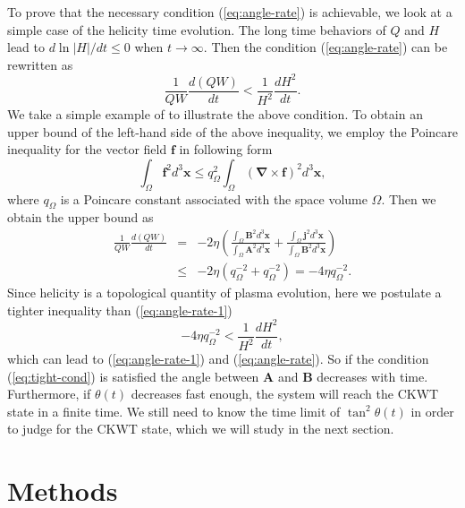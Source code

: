 \documentclass[english,aps,superscriptaddress,preprint]{revtex4-1}
\begin{document}
To prove that the necessary condition (\ref{eq:angle-rate}) is achievable,
we look at a simple case of the helicity time evolution. The long
time behaviors of $Q$ and $H$ lead to $d\ln|H|/dt\leq0$ when $t\rightarrow\infty$.
Then the condition (\ref{eq:angle-rate}) can be rewritten as 
\begin{equation}
\frac{1}{QW}\frac{d(QW)}{dt}<\frac{1}{H^{2}}\frac{dH^{2}}{dt}.\label{eq:angle-rate-1}
\end{equation}
We take a simple example of to illustrate the above condition. To
obtain an upper bound of the left-hand side of the above inequality,
we employ the Poincare inequality for the vector field $\boldsymbol{f}$
in following form \citep{Poincare1890}
\begin{equation}
\int_{\Omega}\boldsymbol{f}^{2}d^{3}\boldsymbol{x}\leq q_{\Omega}^{2}\int_{\Omega}(\boldsymbol{\nabla\times f})^{2}d^{3}\boldsymbol{x},
\end{equation}
where $q_{\Omega}$ is a Poincare constant associated with the space
volume $\Omega$. Then we obtain the upper bound as 
\begin{eqnarray}
\frac{1}{QW}\frac{d(QW)}{dt} & = & -2\eta\left(\frac{\int_{\Omega}\boldsymbol{B}^{2}d^{3}\boldsymbol{x}}{\int_{\Omega}\boldsymbol{A}^{2}d^{3}\boldsymbol{x}}+\frac{\int_{\Omega}\boldsymbol{j}^{2}d^{3}\boldsymbol{x}}{\int_{\Omega}\boldsymbol{B}^{2}d^{3}\boldsymbol{x}}\right)\nonumber \\
 & \leq & -2\eta(q_{\Omega}^{-2}+q_{\Omega}^{-2})=-4\eta q_{\Omega}^{-2}.
\end{eqnarray}
Since helicity is a topological quantity of plasma evolution, here
we postulate a tighter inequality than (\ref{eq:angle-rate-1})
\begin{equation}
-4\eta q_{\Omega}^{-2}<\frac{1}{H^{2}}\frac{dH^{2}}{dt},\label{eq:tight-cond}
\end{equation}
which can lead to (\ref{eq:angle-rate-1}) and (\ref{eq:angle-rate}).
So if the condition (\ref{eq:tight-cond}) is satisfied the angle
between $\boldsymbol{A}$ and \textbf{$\boldsymbol{B}$} decreases
with time. Furthermore, if $\theta(t)$ decreases fast enough, the
system will reach the CKWT state in a finite time. We still need to
know the time limit of $\tan^{2}\theta(t)$ in order to judge for
the CKWT state, which we will study in the next section.


\section{Methods}
\end{document}
